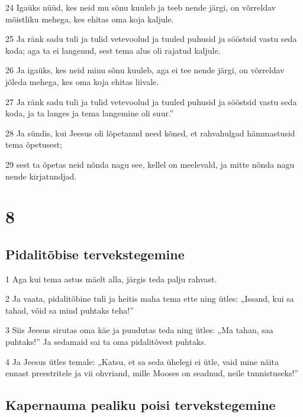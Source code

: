 \par 24 Igaüks nüüd, kes neid mu sõnu kuuleb ja teeb nende järgi, on võrreldav mõistliku mehega, kes ehitas oma koja kaljule.
\par 25 Ja ränk sadu tuli ja tulid vetevoolud ja tuuled puhusid ja sööstsid vastu seda koda; aga ta ei langenud, sest tema alus oli rajatud kaljule.
\par 26 Ja igaüks, kes neid minu sõnu kuuleb, aga ei tee nende järgi, on võrreldav jõleda mehega, kes oma koja ehitas liivale.
\par 27 Ja ränk sadu tuli ja tulid vetevoolud ja tuuled puhusid ja sööstsid vastu seda koda, ja ta langes ja tema langemine oli suur.”
\par 28 Ja sündis, kui Jeesus oli lõpetanud need kõned, et rahvahulgad hämmastusid tema õpetusest;
\par 29 sest ta õpetas neid nõnda nagu see, kellel on meelevald, ja mitte nõnda nagu nende kirjatundjad.


\chapter{8}

\section*{Pidalitõbise tervekstegemine}

\par 1 Aga kui tema astus mäelt alla, järgis teda palju rahvast.
\par 2 Ja vaata, pidalitõbine tuli ja heitis maha tema ette ning ütles: „Issand, kui sa tahad, võid sa mind puhtaks teha!”
\par 3 Siis Jeesus sirutas oma käe ja puudutas teda ning ütles: „Ma tahan, saa puhtaks!” Ja sedamaid sai ta oma pidalitõvest puhtaks.
\par 4 Ja Jeesus ütles temale: „Katsu, et sa seda ühelegi ei ütle, vaid mine näita ennast preestritele ja vii ohvriand, mille Mooses on seadnud, neile tunnistuseks!”

\section*{Kapernauma pealiku poisi tervekstegemine}

